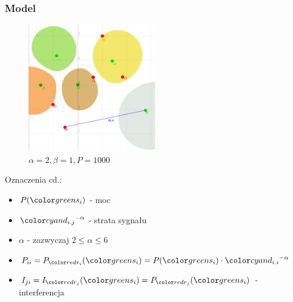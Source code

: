 \documentclass[polish, t,10pt]{beamer}
\begin{document}
    \begin{frame}
        \frametitle{Model}
        \begin{figure}
            \includegraphics[width=0.5\textwidth]{pictures/model-diagram1.png}
            \caption{$\alpha=2, \beta=1, P=1000$}
        \end{figure}
        Oznaczenia cd.:
        \begin{itemize}
            \item $P(\si)$ - moc
            \item $\dij^{-\alpha}$ - strata sygnału
            \item $\alpha$ - zazwyczaj $2 \le \alpha \leq 6$
            \item $P_{ii} = P_{\ri}(\si) = P(\si) \cdot \dii^{-\alpha}$
            \item $I_{ji} = I_{\rj}(\si) = P_{\rj}(\si)$ - interferencja
        \end{itemize}
    \end{frame}
\end{document}
